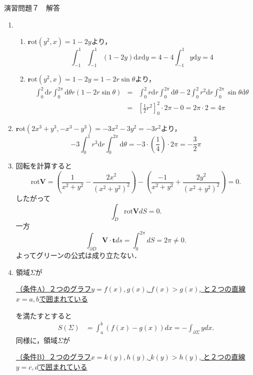 \documentclass{jarticle}
\def\d{\mathrm d}
\def\rot{\mathrm{\bm rot}}
\begin{document}
\begin{center} {\Large 演習問題７　解答} \end{center}
  \begin{enumerate}
    \item
      \begin{enumerate}
        \item
          $\rot (y^2,x) = 1-2y$より，
          \[ \int_{-1}^{1} \int_{-1}^{1} (1-2y) \d x \d y =  4 - 4 \int_{-1}^{1} y \d y = 4 \]
        \item
          $\rot (y^2,x) = 1-2y = 1 - 2 r \sin \theta$より，
          \begin{eqnarray*}
            \int_0^2 \d r \int_0^{2\pi} \d \theta r ( 1 - 2r \sin \theta ) & = & \int_0^2 r \d r \int_0^{2\pi} \d \theta -2 \int_0^2 r^2 \d r \int_0^{2\pi} \sin \theta \d \theta \\
            & = & \left[ \frac{1}{2} r^2 \right]_0^2 \cdot 2 \pi - 0 = 2\pi \cdot 2 = 4\pi
          \end{eqnarray*}
      \end{enumerate}
    \item
      $\rot ( 2x^3+y^3, -x^3-y^3) = -3x^2 - 3y^2 = -3r^2$より，
      \[ -3 \int_0^1 r^3 \d r \int_0^{2\pi} \d \theta = -3 \cdot ( \frac{1}{4} ) \cdot 2\pi = - \frac{3}{2} \pi \]
    \item 
   回転を計算すると 
   $$
   \mathrm{rot} \bm V =\left( \frac{1}{x^{2}+y^{2}} - \frac{2x^{2}}{(x^{2}+y^{2})^{2}}\right)- \left( \frac{-1}{x^{2}+y^{2}} + \frac{2y^{2}}{(x^{2}+y^{2})^{2}}\right)=0.
   $$
   したがって
   $$
    \int_{D} \mathrm{rot} \bm V dS = 0.
    $$
    一方
    $$
    \int_{\partial D}\bm V \cdot \bm t ds = \int_{0}^{2\pi} dS =2\pi \not = 0.
    $$
   よってグリーンの公式は成り立たない．
    \item
      領域$\Sigma$が
      
      \underline{（条件A）２つのグラフ$y=f(x), g(x)$, $f(x)>g(x)$, と２つの直線$x=a,b$で囲まれている}
      
      を満たすとすると
      \begin{align*}
      S(\Sigma)&=\int_{a}^{b} \left( f(x)-g(x) \right) dx =-\int _{\partial \Sigma} y dx.
      \end{align*}
      同様に，領域$\Sigma$が
      
      \underline{（条件B）２つのグラフ$x=k(y), h(y)$, $k(y)>h(y)$, と２つの直線$y=c,d$で囲まれている}
      

\end{enumerate}
\end{document}
